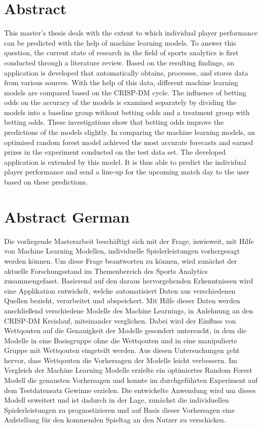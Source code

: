 \chapter*{Abstract}

This master's thesis deals with the extent to which individual player performance can be predicted with the help of machine learning models. To answer this question, the current state of research in the field of sports analytics is first conducted through a literature review. Based on the resulting findings, an application is developed that automatically obtains, processes, and stores data from various sources. With the help of this data, different machine learning models are compared based on the CRISP-DM cycle. The influence of betting odds on the accuracy of the models is examined separately by dividing the models into a baseline group without betting odds and a treatment group with betting odds. These investigations show that betting odds improve the predictions of the models slightly. In comparing the machine learning models, an optimised random forest model achieved the most accurate forecasts and earned prizes in the experiment conducted on the test data set. The developed application is extended by this model. It is thus able to predict the individual player performance and send a line-up for the upcoming match day to the user based on these predictions.

\clearpage \chapter*{Abstract German}

Die vorliegende Masterarbeit beschäftigt sich mit der Frage, inwieweit, mit Hilfe von Machine Learning Modellen, individuelle Spielerleistungen vorhergesagt werden können. Um diese Frage beantworten zu können, wird zunächst der aktuelle Forschungsstand im Themenbereich des Sports Analytics zusammengefasst. Basierend auf den daraus hervorgehenden Erkenntnissen wird eine Applikation entwickelt, welche automatisiert Daten aus verschiedenen Quellen bezieht, verarbeitet und abspeichert. Mit Hilfe dieser Daten werden anschließend verschiedene Modelle des Machine Learnings, in Anlehnung an den CRISP-DM Kreislauf, miteinander verglichen. Dabei wird der Einfluss von Wettqouten auf die Genauigkeit der Modelle gesondert untersucht, in dem die Modelle in eine Basisgruppe ohne die Wettqouten und in eine manipulierte Gruppe mit Wettqouten eingeteilt werden. Aus diesen Untersuchungen geht hervor, dass Wettqouten die Vorhersagen der Modelle leicht verbessern. Im Vergleich der Machine Learning Modelle erzielte ein optimiertes Random Forest Modell die genausten Vorhersagen und konnte im durchgeführten Experiment auf dem Testdatensatz Gewinne erzielen. Die entwickelte Anwendung wird um dieses Modell erweitert und ist dadurch in der Lage, zunächst die individuellen Spielerleistungen zu prognostizieren und auf Basis dieser Vorhersagen eine Aufstellung für den kommenden Spieltag an den Nutzer zu verschicken.